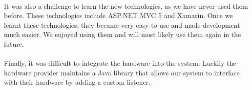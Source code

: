 \documentclass{article}
\begin{document}
\paragraph{}It was also a challenge to learn the new technologies, as we have never used them before. These technologies include ASP.NET MVC 5 and Xamarin. Once we learnt these technologies, they became very easy to use and made development much easier. We enjoyed using them and will most likely use them again in the future.

\paragraph{}Finally, it was difficult to integrate the hardware into the system. Luckily the hardware provider maintains a Java library that allows our system to interface with their hardware by adding a custom listener.
\end{document}
